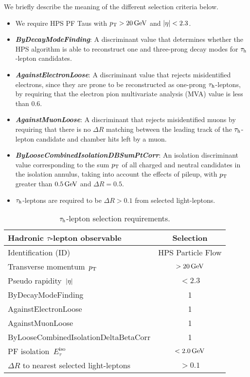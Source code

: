 We briefly describe the meaning of the different selection criteria below.
\begin{itemize}
\item We require HPS PF Taus with $p_{\mathrm{T}} > 20\,\text{Ge\hspace{-.08em}V}$ and $\lvert \eta \rvert < 2.3$.
\item \textbf{\textit{ByDecayModeFinding}}: A discriminant value that determines whether the HPS algorithm 
is able to reconstruct one and three-prong decay modes for $\tau_\textrm{h}$-lepton candidates.
\item \textbf{\textit{AgainstElectronLoose}}: A discriminant value that rejects misidentified electrons, since 
they are prone to be reconstructed as one-prong $\tau_\textrm{h}$-leptons, by requiring  
that the electron pion multivariate analysis (MVA) value is less than 0.6. 
\item \textbf{\textit{AgainstMuonLoose}}: A discriminant that rejects misidentified muons by requiring
that there is no $\Delta R$ matching between the leading track of the $\tau_\textrm{h}$-lepton 
candidate and chamber hits left by a muon.
\item \textbf{\textit{ByLooseCombinedIsolationDBSumPtCorr}}: An isolation discriminant value corresponding 
to the sum $p_{\mathrm{T}}$ of all charged and neutral candidates in the isolation annulus, taking into account the effects of pileup, with $p_{\mathrm{T}}$ greater than $0.5\,\text{Ge\hspace{-.08em}V}$ and $\Delta R = 0.5$.
\item $\tau_\textrm{h}$-leptons are required to be $\Delta{R} > 0.1$ from selected light-leptons.
\end{itemize}


\begin{table*}[!hbtp]
\centering
\caption{$\tau_\textrm{h}$-lepton selection requirements.}
\label{tab:HadronicTauSelections}
\begin{tabular}{l|c}
\hline \hline
Hadronic $\tau$-lepton observable & Selection \\
\hline \hline
Identification (ID) & HPS Particle Flow \\
Transverse momentum~$p_{\mathrm{T}}$ & $> 20\,\text{Ge\hspace{-.08em}V}$ \\
Pseudo rapidity~$\lvert \eta \rvert$ & $< 2.3$ \\
ByDecayModeFinding & 1  \\
AgainstElectronLoose & 1 \\
AgainstMuonLoose & 1 \\
ByLooseCombinedIsolationDeltaBetaCorr & 1 \\
PF isolation~$E^{\textrm{iso}}_{\tau}$ & $< 2.0\,\text{Ge\hspace{-.08em}V}$ \\
$\Delta{R}$ to nearest selected light-leptons & $> 0.1$ \\
\hline \hline
\end{tabular}
\end{table*}



